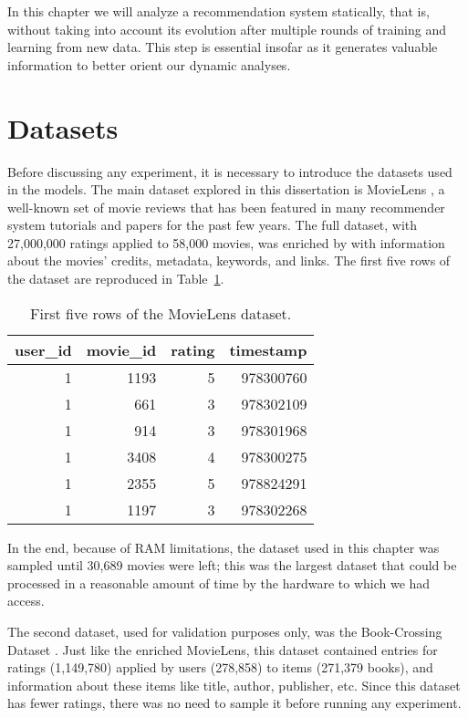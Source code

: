 In this chapter we will analyze a recommendation system statically, that is,
without taking into account its evolution after multiple rounds of training and
learning from new data. This step is essential insofar as it generates valuable
information to better orient our dynamic analyses.

\section{Datasets}
\label{sec:datasets03}

Before discussing any experiment, it is necessary to introduce the datasets used
in the models. The main dataset explored in this dissertation is MovieLens
\citep{harper_movielens_2015}, a well-known set of movie reviews that has been
featured in many recommender system tutorials and papers for the past few years.
The full dataset, with 27,000,000 ratings applied to 58,000 movies, was enriched
by \citet{banik_movies_2017} with information about the movies' credits,
metadata, keywords, and links. The first five rows of the dataset are reproduced
in Table~\ref{tab:tab03_head}.

\begin{table}[h]
  \begin{tabular}{ |r|r|r|r| }
    \hline
    user\_id & movie\_id & rating & timestamp\\
    \hline
    1 & 1193 & 5 & 978300760\\
    \hline
    1 & 661 & 3 & 978302109\\
    \hline
    1 & 914 & 3 & 978301968\\
    \hline
    1 & 3408 & 4 & 978300275\\
    \hline
    1 & 2355 & 5 & 978824291\\
    \hline
    1 & 1197 & 3 & 978302268\\
    \hline
  \end{tabular}

  \caption{First five rows of the MovieLens dataset.}
  \label{tab:tab03_head}
\end{table}

In the end, because of RAM limitations, the dataset used in this chapter was
sampled until 30,689 movies were left; this was the largest dataset that could
be processed in a reasonable amount of time by the hardware to which we had
access.

The second dataset, used for validation purposes only, was the Book-Crossing
Dataset \citep{ziegler_book-crossing_2004}. Just like the enriched MovieLens,
this dataset contained entries for ratings (1,149,780) applied by users
(278,858) to items (271,379 books), and information about these items like
title, author, publisher, etc. Since this dataset has fewer ratings, there was
no need to sample it before running any experiment.

